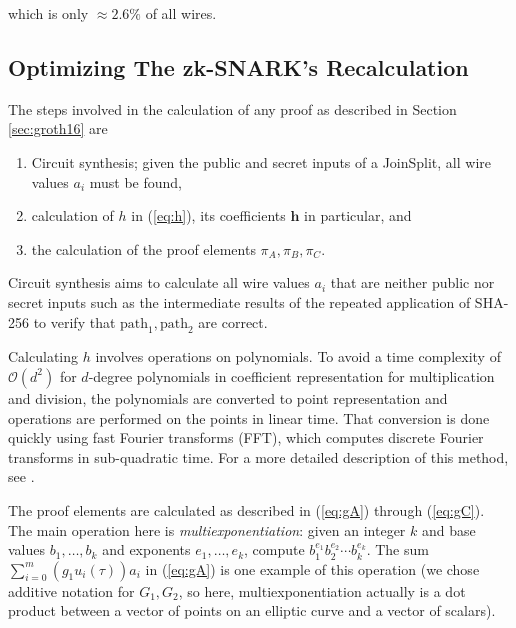 \documentclass{article}
\begin{document}
which is only $\approx 2.6\%$ of all wires.


\subsection{Optimizing The zk-SNARK's Recalculation} \label{sec:opt}

The steps involved in the calculation of any proof as described in Section \ref{sec:groth16} are

\begin{enumerate}
        \item Circuit synthesis; given the public and secret inputs of a JoinSplit, all wire values $a_i$ must be found, 
        \item calculation of $h$ in (\ref{eq:h}), its coefficients $\boldsymbol{h}$ in particular, and
        \item the calculation of the proof elements $\pi_A, \pi_B, \pi_C$.
\end{enumerate}

Circuit synthesis aims to calculate all wire values $a_i$ that are neither public nor secret inputs such as the intermediate results of the repeated application of SHA-256 to verify that $\text{path}_1, \text{path}_2$ are correct.

Calculating $h$ involves operations on polynomials.
To avoid a time complexity of $\mathcal{O}(d^2)$ for $d$-degree polynomials in coefficient representation for multiplication and division, the polynomials are converted to point representation and operations are performed on the points in linear time.
That conversion is done quickly using fast Fourier transforms (FFT), which computes discrete Fourier transforms in sub-quadratic time.
For a more detailed description of this method, see \cite{cormen:clrs}.

The proof elements are calculated as described in (\ref{eq:gA}) through (\ref{eq:gC}).
The main operation here is \textit{multiexponentiation}: given an integer $k$ and base values $b_1, \ldots, b_k$ and exponents $e_1, \ldots, e_k$, compute $b_1^{e_1}b_2^{e_2}\cdots b_k^{e_k}$.
The sum $\sum_{i=0}^m {(g_1{u_i(\tau)})}{a_i}$ in (\ref{eq:gA}) is one example of this operation (we chose additive notation for $G_1, G_2$, so here, multiexponentiation actually is a dot product between a vector of points on an elliptic curve and a vector of scalars).
\end{document}
